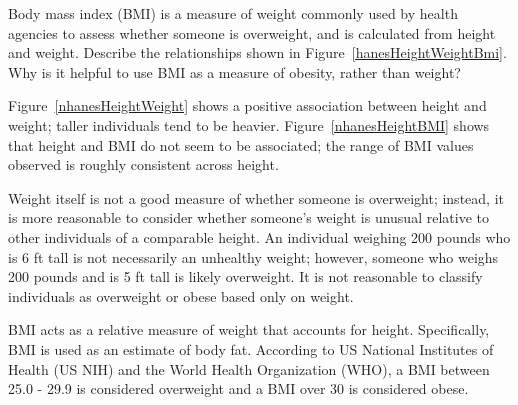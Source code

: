 \begin{examplewrap}
\begin{nexample}{Body mass index (BMI) is a measure of weight commonly used by health agencies to assess whether someone is overweight, and is calculated from height and weight.\footnotemark{} Describe the relationships shown in Figure~\ref{hanesHeightWeightBmi}. Why is it helpful to use BMI as a measure of obesity, rather than weight?}

Figure~\ref{nhanesHeightWeight}	shows a positive association between height and weight; taller individuals tend to be heavier. Figure~\ref{nhanesHeightBMI} shows that height and BMI do not seem to be associated; the range of BMI values observed is roughly consistent across height. 

Weight itself is not a good measure of whether someone is overweight; instead, it is more reasonable to consider whether someone's weight is unusual relative to other individuals of a comparable height. An individual weighing 200 pounds who is 6 ft tall is not necessarily an unhealthy weight; however, someone who weighs 200 pounds and is 5 ft tall is likely overweight. It is not reasonable to classify individuals as overweight or obese based only on weight.

BMI acts as a relative measure of weight that accounts for height. Specifically, BMI is used as an estimate of body fat. According to US National Institutes of Health (US NIH) and the World Health Organization (WHO), a BMI between 25.0 - 29.9 is considered overweight and a BMI over 30 is considered obese.\footnotemark{}
\end{nexample}
\end{examplewrap}
\addtocounter{footnote}{-1}%
%
\addtocounter{footnote}{1}%

